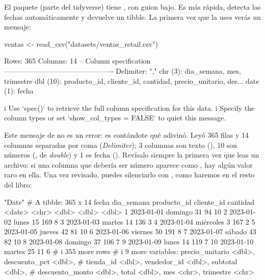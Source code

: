 El paquete  (parte del tidyverse) tiene
, con guion bajo. Es más rápida, detecta las fechas
automáticamente y devuelve un tibble. La primera vez que la uses verás un
mensaje:

\begin{rcode}
ventas <- read_csv("datasets/ventas_retail.csv")
\end{rcode}
\begin{rsalida}
Rows: 365 Columns: 14
-- Column specification ----------------------------------------------
Delimiter: ","
chr   (3): dia_semana, mes, trimestre
dbl  (10): producto_id, cliente_id, cantidad, precio_unitario, des...
date  (1): fecha

i Use `spec()` to retrieve the full column specification for this data.
i Specify the column types or set `show_col_types = FALSE` to quiet this message.
\end{rsalida}

Este mensaje de  no es un error: es
 contándote qué adivinó. Leyó 365 filas y 14 columnas
separadas por coma (\emph{Delimiter}); 3 columnas son texto
(), 10 son números (, de \emph{double}) y 1 es
fecha (). Revísalo siempre la primera vez que leas un archivo:
si una columna que debería ser número aparece como , hay algún
valor raro en ella. Una vez revisado, puedes silenciarlo con
, como haremos en el resto del libro:

\begin{rsalida}
[1] "Date"
# A tibble: 365 x 14
   fecha      dia_semana producto_id cliente_id cantidad
   <date>     <chr>            <dbl>      <dbl>    <dbl>
 1 2023-01-01 domingo             31         94       10
 2 2023-01-02 lunes               15        169        8
 3 2023-01-03 martes              14        136        3
 4 2023-01-04 miércoles            3        167        2
 5 2023-01-05 jueves              42         81       10
 6 2023-01-06 viernes             50        191        8
 7 2023-01-07 sábado              43         82       10
 8 2023-01-08 domingo             37        106        7
 9 2023-01-09 lunes               14        119        7
10 2023-01-10 martes              25         11        6
# i 355 more rows
# i 9 more variables: precio_unitario <dbl>, descuento_pct <dbl>,
#   tienda_id <dbl>, vendedor_id <dbl>, subtotal <dbl>,
#   descuento_monto <dbl>, total <dbl>, mes <chr>, trimestre <chr>
\end{rsalida}

